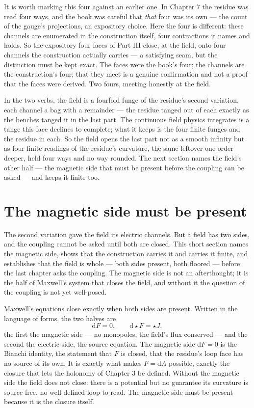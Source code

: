 It is worth marking this four against an earlier one. In Chapter 7 the residue was read four ways, and the book was careful
that \emph{that} four was its own --- the count of the gauge's projections, an expository choice. Here the four is different:
these channels are enumerated in the construction itself, four contractions it names and holds. So the expository four
faces of Part III close, at the field, onto four channels the construction actually carries --- a satisfying seam, but the distinction must be kept
exact. The faces were the book's four; the channels are the construction's four; that they meet is a genuine confirmation and
not a proof that the faces were derived. Two fours, meeting honestly at the field.

In the two verbs, the field is a fourfold funge of the residue's second variation, each channel a bag with a remainder ---
the residue tanged out of each exactly as the benches tanged it in the last part. The continuous field physics integrates is
a tange this face declines to complete; what it keeps is the four finite funges and the residue in each. So the field opens
the last part not as a smooth infinity but as four finite readings of the residue's curvature, the same leftover one order
deeper, held four ways and no way rounded. The next section names the field's other half --- the magnetic side that must be
present before the coupling can be asked --- and keeps it finite too.

\section{The magnetic side must be present}

The second variation gave the field its electric channels. But a field has two sides, and the coupling cannot be asked until
both are closed. This short section names the magnetic side, shows that the construction carries it and carries it finite,
and establishes that the field is whole --- both sides present, both floored --- before the last chapter asks the coupling.
The magnetic side is not an afterthought; it is the half of Maxwell's system that closes the field, and without it the
question of the coupling is not yet well-posed.

Maxwell's equations close exactly when both sides are present. Written in the language of forms, the two halves are
\[
  \mathrm{d}F = 0, \qquad \mathrm{d}\star F = \star J ,
\]
the first the magnetic side --- no monopoles, the field's flux conserved --- and the second the electric side, the source
equation. The magnetic side $\mathrm{d}F = 0$ is the Bianchi identity, the statement that $F$ is closed, that the residue's
loop face has no source of its own. It is exactly what makes $F = \mathrm{d}A$ possible, exactly the closure that lets the
holonomy of Chapter 3 be defined. Without the magnetic side the field does not close: there is a potential but no guarantee
its curvature is source-free, no well-defined loop to read. The magnetic side must be present because it is the closure
itself.

